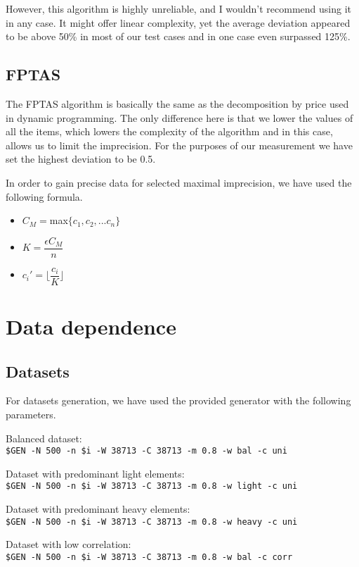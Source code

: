 However, this algorithm is highly unreliable, and I wouldn't recommend using it in any case.
It might offer linear complexity, yet the average deviation appeared to be above 50\%
in most of our test cases and in one case even surpassed 125\%.

\subsection{FPTAS}

The FPTAS algorithm is basically the same as the decomposition by price used in dynamic programming.
The only difference here is that we lower the values of all the items, which lowers the complexity
of the algorithm and in this case, allows us to limit the imprecision. For the purposes of our measurement
we have set the highest deviation to be 0.5.

In order to gain precise data for selected maximal imprecision, we have used the following formula.

\begin{itemize}
    \item $C_M = $max$\{c_1,c_2, ... c_n\}$
    \item $K = \dfrac{\epsilon C_M}{n}$
    \item $c_i' = \lfloor\dfrac{c_i}{K}\rfloor$
\end{itemize}


\section{Data dependence}
\subsection{Datasets}
For datasets generation, we have used the provided generator\cite{WEBSITE:dataGen} with the following parameters.

Balanced dataset:\\
\texttt{\$GEN -N 500 -n \$i -W 38713 -C 38713 -m 0.8 -w bal -c uni}

Dataset with predominant light elements:\\
\texttt{\$GEN -N 500 -n \$i -W 38713 -C 38713 -m 0.8 -w light -c uni}

Dataset with predominant heavy elements:\\
\texttt{\$GEN -N 500 -n \$i -W 38713 -C 38713 -m 0.8 -w heavy -c uni}

Dataset with low correlation:\\
\texttt{\$GEN -N 500 -n \$i -W 38713 -C 38713 -m 0.8 -w bal -c corr}

